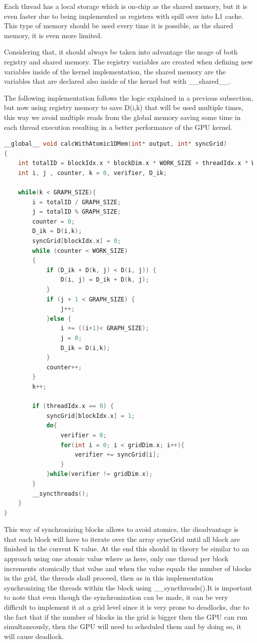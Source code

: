 \documentclass[conference]{IEEEtran}
\begin{document}
Each thread has a local storage which is on-chip as the shared memory, but it is even faster due to being implemented as registers with spill over into L1 cache. This type of memory should be used every time it is possible, as the shared memory, it is even more limited.

Considering that, it should always be taken into advantage the usage of both registry and shared memory. The registry variables are created when defining new variables inside of the kernel implementation, the shared memory are the variables that are declared also inside of the kernel but with \_\_shared\_\_.

The following implementation follows the logic explained in a previous subsection, but now using registry memory to save D(i,k) that will be used multiple times, this way we avoid multiple reads from the global memory saving some time in each thread execution resulting in a better performance of the GPU kernel.


\begin{lstlisting}[language=C++, caption=CUDA implementation with memory improvements]
__global__ void calcWithAtomic1DMem(int* output, int* syncGrid)
{
	int totalID = blockIdx.x * blockDim.x * WORK_SIZE + threadIdx.x * WORK_SIZE;
	int i, j , counter, k = 0, verifier, D_ik;

	while(k < GRAPH_SIZE){
		i = totalID / GRAPH_SIZE;
		j = totalID % GRAPH_SIZE;
		counter = 0;
		D_ik = D(i,k);
		syncGrid[blockIdx.x] = 0;
		while (counter < WORK_SIZE)
		{
			if (D_ik + D(k, j) < D(i, j)) {
				D(i, j) = D_ik + D(k, j);
			}
			if (j + 1 < GRAPH_SIZE) {
				j++;
			}else {
				i += ((i+1)< GRAPH_SIZE);
				j = 0;
				D_ik = D(i,k);
			}
			counter++;
		}
		k++;

		if (threadIdx.x == 0) {
			syncGrid[blockIdx.x] = 1;
			do{
				verifier = 0;
				for(int i = 0; i < gridDim.x; i++){
					verifier += syncGrid[i];
				}
			}while(verifier != gridDim.x);		
		}
		__syncthreads();
	}
}
\end{lstlisting}

This way of synchronizing blocks allows to avoid atomics, the disadvantage is that each block will have to iterate over the array syncGrid until all block are finished in the current K value. At the end this should in theory be similar to an approach using one atomic value where as here, only one thread per block increments atomically that value and when the value equals the number of blocks in the grid, the threads shall proceed, then as in this implementation synchronizing the threads within the block using \_\_syncthreads().It is important to note that even though the synchronization can be made, it can be very difficult to implement it at a grid level since it is very prone to deadlocks, due to the fact that if the number of blocks in the grid is bigger then the GPU can run simultaneously, then the GPU will need to scheduled them and by doing so, it will cause deadlock.
\end{document}
